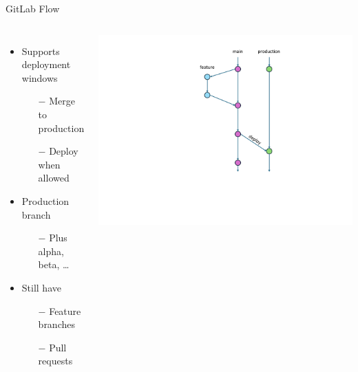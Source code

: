 \documentclass{slide}
\begin{document}
\begin{frame}{GitLab Flow \cite{gitlab-flow}}
    \vspace{1pt}
    \begin{columns}
      {\LARGE
        \vspace{-1.5em}
        \begin{itemize}
            \item Supports deployment windows
            \begin{itemize}
                \Large\item[$-$] Merge to production
                \vspace{0.5mm}
                \Large\item[$-$] Deploy when allowed
            \end{itemize}
            \vspace{2mm}
            \item Production branch
            \begin{itemize}
                \Large\item[$-$] Plus alpha, beta, \dots
            \end{itemize}
            \vspace{1.5mm}
            \item Still have
            \begin{itemize}
                \Large\item[$-$] Feature branches
                \vspace{0.5mm}
                \Large\item[$-$] Pull requests
            \end{itemize}
        \end{itemize}
      }
        \centering
        \includegraphics[trim=275 100 125 33,clip,height=\textheight]{diagrams/branching-diagrams/gitlab-flow}
    \end{columns}
\end{frame}
\end{document}

